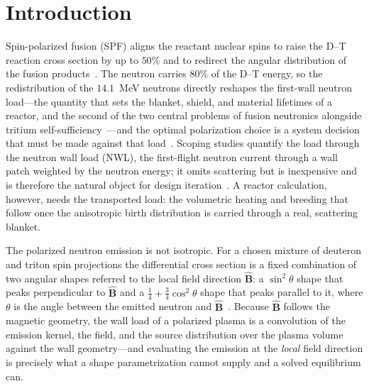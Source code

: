 \documentclass[11pt]{article}
\newcommand{\Bhat}{\hat{\bm{B}}}
\begin{document}
\section{Introduction}
\label{sec:intro}

Spin-polarized fusion (SPF) aligns the reactant nuclear spins to raise the D--T reaction
cross section by up to $50\%$ and to redirect the angular distribution of the fusion
products~\cite{kulsrud1982,parisi2024,schwartz2025}. The neutron carries $80\%$ of the
D--T energy, so the redistribution of the $14.1$~MeV neutrons directly reshapes the
first-wall neutron load---the quantity that sets the blanket, shield, and material
lifetimes of a reactor, and the second of the two central problems of fusion neutronics
alongside tritium self-sufficiency~\cite{lyytinen2024}---and the optimal polarization
choice is a system decision that must be made against that load~\cite{schwartz2025,lion2022}.
Scoping studies quantify the load through the neutron wall load (NWL), the first-flight
neutron current through a wall patch weighted by the neutron energy; it omits scattering
but is inexpensive and is therefore the natural object for design
iteration~\cite{lion2022,schwartz2025}. A reactor calculation, however, needs the
transported load: the volumetric heating and breeding that follow once the anisotropic
birth distribution is carried through a real, scattering blanket.

The polarized neutron emission is not isotropic. For a chosen mixture of deuteron and
triton spin projections the differential cross section is a fixed combination of two
angular shapes referred to the local field direction $\Bhat$: a $\sin^2\theta$ shape that
peaks perpendicular to $\Bhat$ and a $\tfrac14+\tfrac34\cos^2\theta$ shape that peaks
parallel to it, where $\theta$ is the angle between the emitted neutron and
$\Bhat$~\cite{schwartz2025}. Because $\Bhat$ follows the magnetic geometry, the wall load
of a polarized plasma is a convolution of the emission kernel, the field, and the source
distribution over the plasma volume against the wall geometry---and evaluating the
emission at the \emph{local} field direction is precisely what a shape parametrization
cannot supply and a solved equilibrium can.
\end{document}
